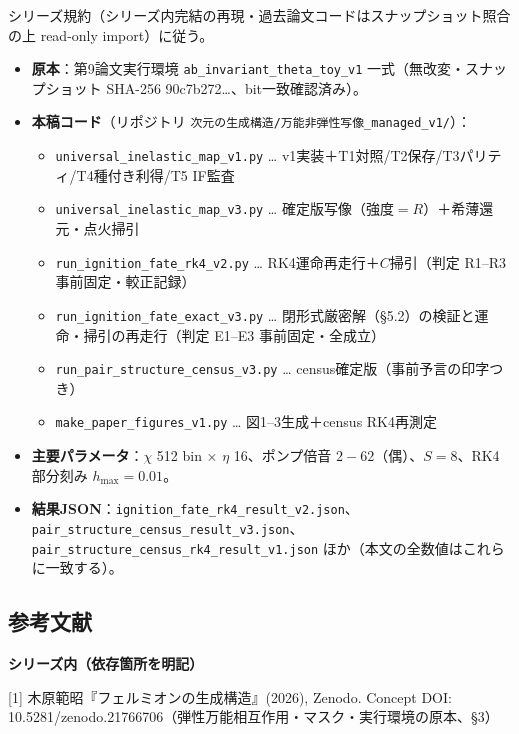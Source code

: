 \documentclass[
  a4paper,
]{ltjsarticle}
\providecommand{\tightlist}{%
  \setlength{\itemsep}{0pt}\setlength{\parskip}{0pt}}
\begin{document}
シリーズ規約（シリーズ内完結の再現・過去論文コードはスナップショット照合の上
read-only import）に従う。

\begin{itemize}
\tightlist
\item
  \textbf{原本}：第9論文実行環境 \texttt{ab\_invariant\_theta\_toy\_v1}
  一式（無改変・スナップショット SHA-256
  90c7b272\ldots、bit一致確認済み）。
\item
  \textbf{本稿コード}（リポジトリ
  \texttt{次元の生成構造/万能非弾性写像\_managed\_v1/}）：

  \begin{itemize}
  \tightlist
  \item
    \texttt{universal\_inelastic\_map\_v1.py} \ldots{}
    v1実装＋T1対照/T2保存/T3パリティ/T4種付き利得/T5 IF監査
  \item
    \texttt{universal\_inelastic\_map\_v3.py} \ldots{}
    確定版写像（強度\(=R\)）＋希薄還元・点火掃引
  \item
    \texttt{run\_ignition\_fate\_rk4\_v2.py} \ldots{}
    RK4運命再走行＋\(C\)掃引（判定 R1--R3 事前固定・較正記録）
  \item
    \texttt{run\_ignition\_fate\_exact\_v3.py} \ldots{}
    閉形式厳密解（§5.2）の検証と運命・掃引の再走行（判定 E1--E3
    事前固定・全成立）
  \item
    \texttt{run\_pair\_structure\_census\_v3.py} \ldots{}
    census確定版（事前予言の印字つき）
  \item
    \texttt{make\_paper\_figures\_v1.py} \ldots{} 図1--3生成＋census
    RK4再測定
  \end{itemize}
\item
  \textbf{主要パラメータ}：\(\chi\) 512 bin × \(\eta\) 16、ポンプ倍音
  \(2\!-\!62\)（偶）、\(S=8\)、RK4 部分刻み \(h_{\max}=0.01\)。
\item
  \textbf{結果JSON}：\texttt{ignition\_fate\_rk4\_result\_v2.json}、\texttt{pair\_structure\_census\_result\_v3.json}、\texttt{pair\_structure\_census\_rk4\_result\_v1.json}
  ほか（本文の全数値はこれらに一致する）。
\end{itemize}

\subsection{参考文献}\label{ux53c2ux8003ux6587ux732e}

\textbf{シリーズ内（依存箇所を明記）}

{[}1{]} 木原範昭『フェルミオンの生成構造』(2026), Zenodo. Concept DOI:
10.5281/zenodo.21766706（弾性万能相互作用・マスク・実行環境の原本、§3）
\end{document}
